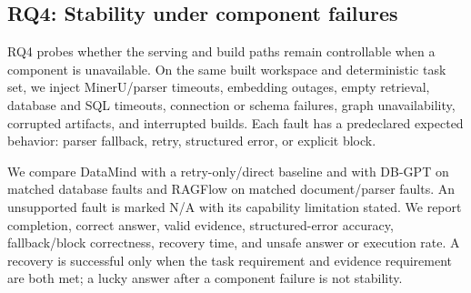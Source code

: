 \begin{table}[t]
\centering\footnotesize
\setlength{\tabcolsep}{6pt}
\caption{RQ3 end-to-end latency, throughput, and memory under concurrency.
Concurrency-one values are the pilot measurements from the earlier report;
the remaining rows are reserved for the controlled rerun.}
\label{tab:rq3-runtime}
\scriptsize
\setlength{\tabcolsep}{4pt}
\end{table}

\subsection{RQ4: Stability under component failures}
\label{sec:eval-rq4}

RQ4 probes whether the serving and build paths remain controllable when a
component is unavailable. On the same built workspace and deterministic task
set, we inject MinerU/parser timeouts, embedding outages, empty retrieval,
database and SQL timeouts, connection or schema failures, graph unavailability,
corrupted artifacts, and interrupted builds. Each fault has a predeclared
expected behavior: parser fallback, retry, structured error, or explicit block.

We compare DataMind with a retry-only/direct baseline and with DB-GPT on
matched database faults and RAGFlow on matched document/parser faults. An
unsupported fault is marked N/A with its capability limitation stated. We report completion, correct answer,
valid evidence, structured-error accuracy, fallback/block correctness,
recovery time, and unsafe answer or execution rate. A recovery is successful
only when the task requirement and evidence requirement are both met; a lucky
answer after a component failure is not stability.

